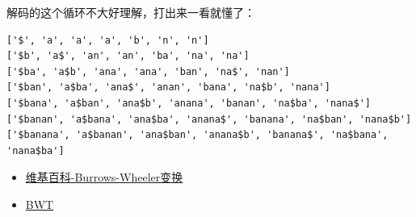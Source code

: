 \documentclass[12pt]{article}
\begin{document}
\begin{Shaded}
\begin{Highlighting}[]
\OperatorTok{=} \StringTok{\textquotesingle{}$\textquotesingle{}}

\OperatorTok{=}\OperatorTok{+}
\OperatorTok{=}\NormalTok{ [source[i:] }\OperatorTok{+} \NormalTok{(}\NormalTok{(source))]}

     \StringTok{\textquotesingle{}\textquotesingle{}}\NormalTok{.join([row[}\OperatorTok{{-}}\NormalTok{] }\NormalTok{ table])}

\OperatorTok{=} 
\OperatorTok{=}\NormalTok{ [}\StringTok{\textquotesingle{}\textquotesingle{}}\NormalTok{] }\OperatorTok{*}

     
\OperatorTok{=} \NormalTok{([encoded[m] }\OperatorTok{+} \NormalTok{(length)])}
\OperatorTok{=}\NormalTok{ [row }\NormalTok{ row.endswith(EOL)][}\NormalTok{]}
\end{Highlighting}
\end{Shaded}

解码的这个循环不大好理解，打出来一看就懂了：

\begin{verbatim}
['$', 'a', 'a', 'a', 'b', 'n', 'n']
['$b', 'a$', 'an', 'an', 'ba', 'na', 'na']
['$ba', 'a$b', 'ana', 'ana', 'ban', 'na$', 'nan']
['$ban', 'a$ba', 'ana$', 'anan', 'bana', 'na$b', 'nana']
['$bana', 'a$ban', 'ana$b', 'anana', 'banan', 'na$ba', 'nana$']
['$banan', 'a$bana', 'ana$ba', 'anana$', 'banana', 'na$ban', 'nana$b']
['$banana', 'a$banan', 'ana$ban', 'anana$b', 'banana$', 'na$bana', 'nana$ba']
\end{verbatim}

\begin{itemize}
\tightlist
\item
  \href{https://zh.wikipedia.org/wiki/Burrows-Wheeler\%E5\%8F\%98\%E6\%8D\%A2}{维基百科-Burrows-Wheeler变换}
\item
  \href{https://www.cs.cmu.edu/~ckingsf/bioinfo-lectures/bwt.pdf}{BWT}
\end{itemize}
\end{document}
